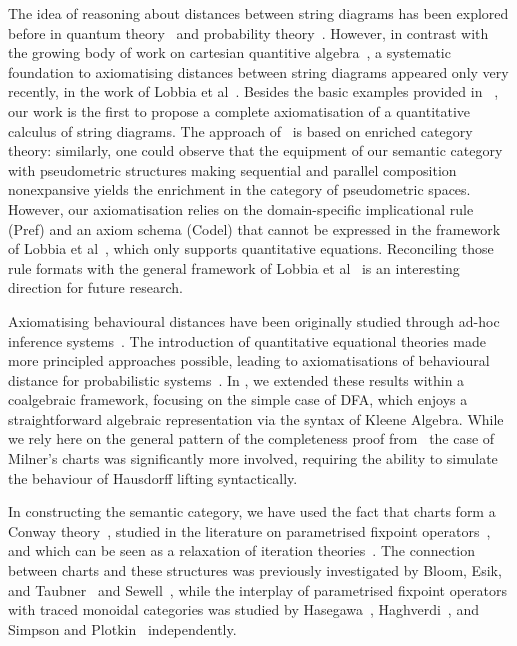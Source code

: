 The idea of reasoning about distances between string diagrams has been explored before in quantum theory~\cite{kissinger2017pictureperfectquantumkeydistribution,Breiner:2019:Graphical,HLarsen2021} and probability theory~\cite{Perrone:2024:Markov}. However, in contrast with the growing body of work on cartesian quantitive algebra~\cite{Mardare:2016:Quantitative,Mio:2024:Universal, Bacci:2024:Sum}, a systematic foundation to axiomatising distances between string diagrams appeared only very recently, in the work of Lobbia et al~\cite{Lobbia:2024:Quantitative}. Besides the basic examples provided in~ \cite{Lobbia:2024:Quantitative}, our work is the first to propose a complete axiomatisation of a quantitative calculus of string diagrams. The approach of~\cite{Lobbia:2024:Quantitative} is based on enriched category theory: similarly, one could observe that the equipment of our semantic category with pseudometric structures making sequential and parallel composition nonexpansive yields the enrichment in the category of pseudometric spaces. However, our axiomatisation relies on the domain-specific implicational rule \textsf{(Pref)} and an axiom schema \textsf{(Codel)} that cannot be expressed in the framework of Lobbia et al~\cite{Lobbia:2024:Quantitative}, which only supports quantitative equations. Reconciling those rule formats with the general framework of Lobbia et al~\cite{Lobbia:2024:Quantitative} is an interesting direction for future research.

Axiomatising behavioural distances have been originally studied through ad-hoc inference systems~\cite{Larsen:2011:Metrics,Argenio:2014:Axiomatizing}. The introduction of quantitative equational theories made more principled approaches possible, leading to axiomatisations of behavioural distance for probabilistic systems~\cite{Bacci:2018:Bisimilarity,Bacci:2018:Algebraic}. In , we extended these results within a coalgebraic framework, focusing on the simple case of DFA, which enjoys a straightforward algebraic representation via the syntax of Kleene Algebra. While we rely here on the general pattern of the completeness proof from~ the case of Milner's charts was significantly more involved, requiring the ability to simulate the behaviour of Hausdorff lifting syntactically.

In constructing the semantic category, we have used the fact that charts form a Conway theory~\cite{Esik:1999:Group}, studied in the literature on parametrised fixpoint operators~\cite{Haghverdi:2000:Categorical,Simpson:2000:Complete,Abramsky:2002:Geometry}, and which can be seen as a relaxation of iteration theories~\cite{Bloom:1993:Iteration}. The connection between charts and these structures was previously investigated by Bloom, Esik, and Taubner~\cite{Bloom:1993:Iteration} and Sewell~\cite{Sewell:1995:Algebra}, while the interplay of parametrised fixpoint operators with traced monoidal categories was studied by Hasegawa~\cite{Hasegawa:1997:Models}, Haghverdi~\cite{Haghverdi:2000:Categorical}, and Simpson and Plotkin~\cite{Simpson:2000:Complete} independently.

